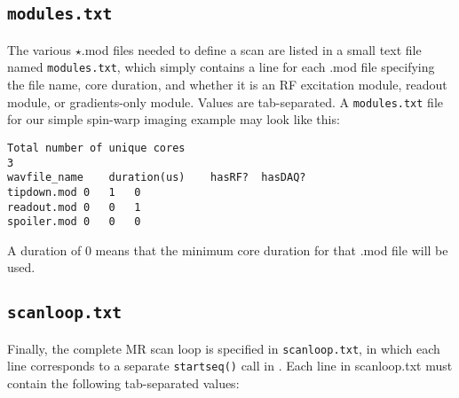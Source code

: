 \subsection{\tt modules.txt}
The various $\star$.mod files needed to define a scan are listed in a small text file named {\tt modules.txt}, which simply contains a line for each .mod file specifying the file name, core duration, and whether it is an RF excitation module, readout module, or gradients-only module.
Values are tab-separated.
A {\tt modules.txt} file for our simple spin-warp imaging example may look like this:
\begin{lstlisting}
Total number of unique cores
3
wavfile_name	duration(us)	hasRF?	hasDAQ?
tipdown.mod	0	1	0
readout.mod	0	0	1
spoiler.mod	0	0	0
\end{lstlisting}
A duration of 0 means that the minimum core duration for that .mod file will be used.

\subsection{\tt scanloop.txt}
Finally, the complete MR scan loop is specified in {\tt scanloop.txt}, in which each line corresponds to a separate {\tt startseq()} call in \toppe.
Each line in scanloop.txt must contain the following tab-separated values:

